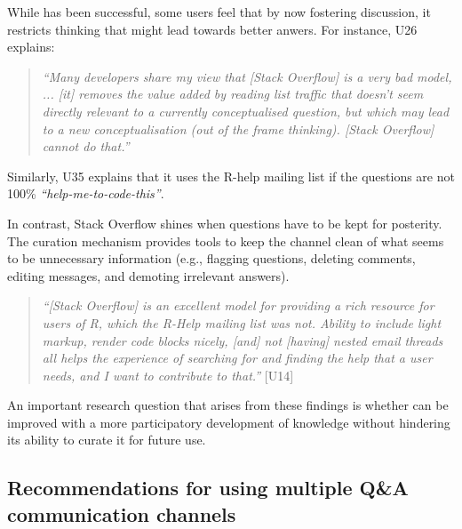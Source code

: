 While \SO  has been successful, some users feel that by now fostering discussion, it restricts thinking that might lead towards better anwers. 
For instance, U26 explains:
    \begin{quote}
        \textit{``Many developers share my view that [Stack Overflow] is a very bad model, ... [it] removes the value added by reading list traffic that doesn't seem directly relevant to a currently conceptualised question, but which may lead to a new conceptualisation (out of the frame thinking). [Stack Overflow] cannot do that.''}
    \end{quote}
    Similarly, U35 explains that it uses the R-help mailing list if the questions are not 100\% \textit{``help-me-to-code-this''}.

    In contrast, Stack Overflow shines when questions have to be kept for posterity. 
    The curation mechanism provides tools to keep the channel clean of what seems to be unnecessary information (e.g., flagging questions, deleting comments, editing messages, and demoting irrelevant answers).

    \begin{quote}
        \textit{``[Stack Overflow] is an excellent model for providing a rich resource for users of R, which the R-Help mailing list was not. 
        Ability to include light markup, render code blocks nicely, [and] not [having] nested email threads all helps the experience of searching for and finding the help that a user needs, and I want to contribute to that.''} [U14]
    \end{quote}


An important research question that arises from these findings is whether \SO can be improved with a more participatory development of knowledge without
hindering its ability to curate it for future use.



\subsection{Recommendations for using multiple Q\&A communication channels}

